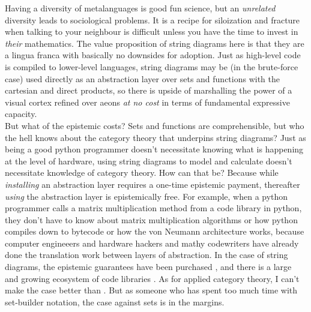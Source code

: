 Having a diversity of metalanguages is good fun science, but an \emph{unrelated} diversity leads to sociological problems. It is a recipe for siloization and fracture when talking to your neighbour is difficult unless you have the time to invest in \emph{their} mathematics. The value proposition of string diagrams here is that they are a lingua franca with basically no downsides for adoption. Just as high-level code is compiled to lower-level languages, string diagrams may be (in the brute-force case) used directly as an abstraction layer over sets and functions with the cartesian and direct products, so there is upside of marshalling the power of a visual cortex refined over aeons \emph{at no cost} in terms of fundamental expressive capacity.\\

But what of the epistemic costs? Sets and functions are comprehensible, but who the hell knows about the category theory that underpins string diagrams? Just as being a good python programmer doesn't necessitate knowing what is happening at the level of hardware, using string diagrams to model and calculate doesn't necessitate knowledge of category theory. How can that be? Because while \emph{installing} an abstraction layer requires a one-time epistemic payment, thereafter \emph{using} the abstraction layer is epistemically free. For example, when a python programmer calls a matrix multiplication method from a code library in python, they don't have to know about matrix multiplication algorithms or how python compiles down to bytecode or how the von Neumann architecture works, because computer engineeers and hardware hackers and mathy codewriters have already done the translation work between layers of abstraction. In the case of string diagrams, the epistemic guarantees have been purchased \citep{joyal_geometry_1991,joyal_geometry_nodate,maclane_natural_1963,lane_categories_2010,selinger_survey_2010}, and there is a large and growing ecosystem of code libraries \citep{sobocinski_graphical_2015,bonchi_interacting_2017,bonchi_graphical_2019,haydon_compositional_2020,lorenz_causal_2023,jacobs_causal_2019,bonchi_categorical_2014,boisseau_string_2022,hedges_string_2015,baez_open_2020,fritz_finettis_2021,cruttwell_categorical_2022,coecke_interacting_2011,coecke_picturing_2017,poor_completeness_2023}. As for applied category theory, I can't make the case better than \citep{fong_invitation_2019}. But as someone who has spent too much time with set-builder notation, the case against sets is in the margins.

